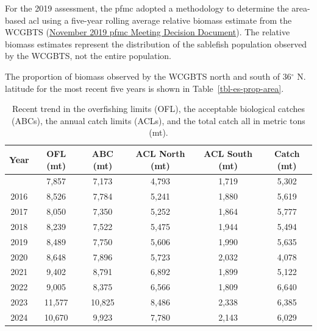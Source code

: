 \documentclass[
  english,
]{article}
\begin{document}
For the 2019 assessment, the \gls{pfmc} adopted a methodology to
determine the area-based \gls{acl} using a five-year rolling average
relative biomass estimate from the WCGBTS
(\href{https://www.pcouncil.org/documents/2019/11/november-2019-decision-document.pdf/}{November
2019 \gls{pfmc} Meeting Decision Document}). The relative biomass
estimates represent the distribution of the sablefish population
observed by the WCGBTS, not the entire population.

The proportion of biomass observed by the WCGBTS north and south of
36\(^\circ\) N. latitude for the most recent five years is shown in
Table~\ref{tbl-es-prop-area}.

\newpage{}

\begingroup
\fontsize{9.0pt}{11.0pt}\selectfont

\begin{longtable}{cccccc}

\caption{\label{tbl-es-management}Recent trend in the overfishing limits
(OFL), the acceptable biological catches (ABCs), the annual catch limits
(ACLs), and the total catch all in metric tons (mt).}

\tabularnewline

\toprule
Year & OFL (mt) & ABC (mt) & ACL North (mt) & ACL South (mt) & Catch (mt) \\ 
\midrule\addlinespace[2.5pt]
2015 & 7,857 & 7,173 & 4,793 & 1,719 & 5,302 \\ 
2016 & 8,526 & 7,784 & 5,241 & 1,880 & 5,619 \\ 
2017 & 8,050 & 7,350 & 5,252 & 1,864 & 5,777 \\ 
2018 & 8,239 & 7,522 & 5,475 & 1,944 & 5,494 \\ 
2019 & 8,489 & 7,750 & 5,606 & 1,990 & 5,635 \\ 
2020 & 8,648 & 7,896 & 5,723 & 2,032 & 4,078 \\ 
2021 & 9,402 & 8,791 & 6,892 & 1,899 & 5,122 \\ 
2022 & 9,005 & 8,375 & 6,566 & 1,809 & 6,640 \\ 
2023 & 11,577 & 10,825 & 8,486 & 2,338 & 6,385 \\ 
2024 & 10,670 & 9,923 & 7,780 & 2,143 & 6,029 \\ 
\bottomrule

\end{longtable}

\endgroup

\begingroup
\fontsize{9.0pt}{11.0pt}\selectfont
\end{document}
